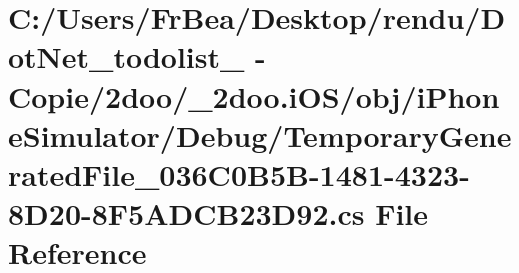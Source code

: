 \hypertarget{i_o_s_2obj_2i_phone_simulator_2_debug_2_temporary_generated_file__036_c0_b5_b-1481-4323-8_d20-8_f5_a_d_c_b23_d92_8cs}{
\section{C:/Users/FrBea/Desktop/rendu/DotNet\_\-todolist\_ - Copie/2doo/\_\-2doo.iOS/obj/iPhoneSimulator/Debug/TemporaryGeneratedFile\_\-036C0B5B-1481-4323-8D20-8F5ADCB23D92.cs File Reference}
\label{i_o_s_2obj_2i_phone_simulator_2_debug_2_temporary_generated_file__036_c0_b5_b-1481-4323-8_d20-8_f5_a_d_c_b23_d92_8cs}
}
